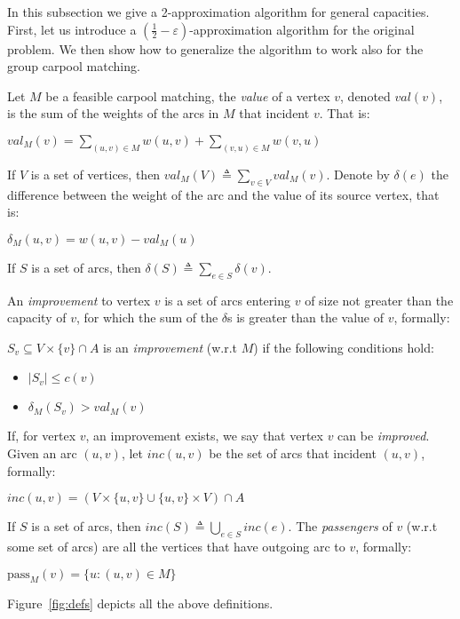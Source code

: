 In this subsection we give a 2-approximation algorithm for general capacities.
First, let us introduce a $(\frac{1}{2} - \varepsilon)$-approximation algorithm
for the original problem.
We then show how to generalize the algorithm to work also for the group carpool
matching.


Let $M$ be a feasible carpool matching,
the \emph{value} of a vertex $v$, denoted $val(v)$, 
is the sum of the weights of the arcs in $M$ that incident $v$. 
That is: 
%
\begin{definition}[$val$]
$val_M(v) = \sum_{(u, v) \in M} w(u, v) + \sum_{(v, u) \in M} w(v, u)$
\end{definition}
%
If $V$ is a set of vertices, then $val_M(V) \triangleq \sum_{v \in V} val_M(v)$.
%
Denote by $\delta(e)$ the difference between the weight of the arc and the value
of its source vertex,
that is:
%
\begin{definition}[$\delta$]
$\delta_M(u, v) = w(u, v) - val_M(u)$
\end{definition}
%
If $S$ is a set of arcs, then $\delta(S) \triangleq \sum_{e \in S}\delta(v)$.

An \emph{improvement} to vertex $v$ 
is a set of arcs entering $v$ of size not greater than the capacity of $v$, 
for which the sum of the $\delta$s is greater than the value of $v$,
formally: 

\begin{definition}[improvement]
$S_v \subseteq V \times \{v\} \cap A$ is an \emph{improvement} (w.r.t $M$)
if the following conditions hold:
\begin{itemize}
\item
$|S_v| \leq c(v)$
\item
$\delta_M(S_v) > val_M(v)$
\end{itemize}  
\end{definition}
%
If, for vertex $v$, an improvement exists, we say that vertex $v$ can be \emph{improved}.
%
Given an arc $(u,v)$, 
let $inc(u,v)$ be the set of arcs that incident $(u, v)$,
formally:
%
\begin{definition}[inc]
$inc(u,v) = (V \times \{u, v\} \cup \{u, v\} \times V) \cap A$
\end{definition}
%
If $S$ is a set of arcs, then $inc(S) \triangleq \bigcup_{e \in S} inc(e)$.
%
The \emph{passengers} of $v$ (w.r.t some set of arcs) are all the vertices that have
outgoing arc to $v$, formally: 
%
\begin{definition}[passengers]
$\text{pass}_M(v) = \{u : (u, v) \in M\}$
\end{definition}
%
Figure~\ref{fig:defs} depicts all the above definitions.

